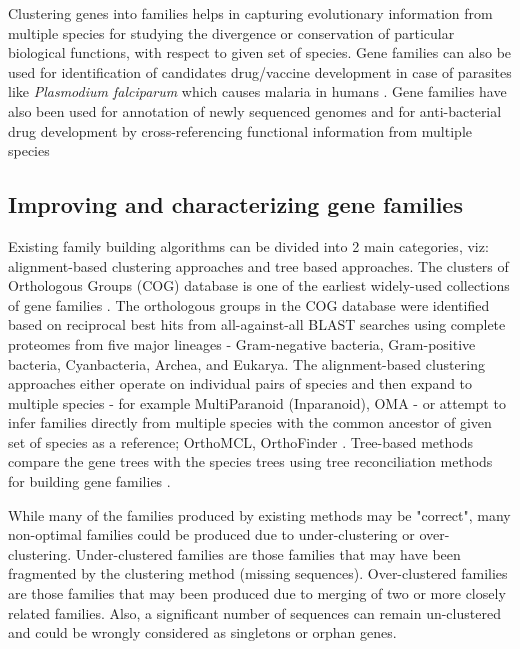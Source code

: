 \documentclass{article}
\begin{document}
		Clustering genes into families helps in capturing evolutionary information from multiple species for studying the divergence or conservation of particular biological functions, with respect to given set of species. Gene families can also be used for identification of candidates drug/vaccine development in case of parasites like \textit{Plasmodium falciparum} which causes malaria in humans \citep{gardner2002genome,kissinger2002plasmodium,whetzel2005plasmodb}. Gene families have also been used for annotation of newly sequenced genomes and for anti-bacterial drug development by cross-referencing functional information from multiple species \citep{tatusov1997genomic,galperin1999searching,natale2000towards,natale2000using,forterre2002hot}
		
		\subsection{Improving and characterizing gene families}
		 Existing family building algorithms can be divided into 2 main categories, viz: alignment-based clustering approaches and tree based approaches. The clusters of Orthologous Groups (COG) database is one of the earliest widely-used collections of gene families \citep{tatusov2000cog,tatusov2001cog}. The orthologous groups in the COG database were identified based on reciprocal best hits from all-against-all BLAST searches using complete proteomes from five major lineages - Gram-negative bacteria, Gram-positive bacteria, Cyanbacteria, Archea, and Eukarya. The alignment-based clustering approaches either operate on individual pairs of species and then expand to multiple species - for example MultiParanoid (Inparanoid), OMA \citep{alexeyenko2006automatic,remm2001automatic,roth2008algorithm,altenhoff2010oma} - or attempt to infer families directly from multiple species with the common ancestor of given set of species as a reference;  OrthoMCL, OrthoFinder \citep{li2003orthomcl,emms2015orthofinder}. Tree-based methods compare the gene trees with the species trees using tree reconciliation methods for building gene families \citep{li2006treefam,van2007orthology,wapinski2007automatic,hubbard2006ensembl,dehal2006phylogenomic}.
		  
		 While many of the families produced by existing methods may be "correct", many non-optimal families could be produced due to under-clustering or over-clustering. Under-clustered families are those families that may have been fragmented by the clustering method (missing sequences). Over-clustered families are those families that may been produced due to merging of two or more closely related families. Also, a significant number of sequences can remain un-clustered and could be wrongly considered as singletons or orphan genes. 
		
\end{document}
